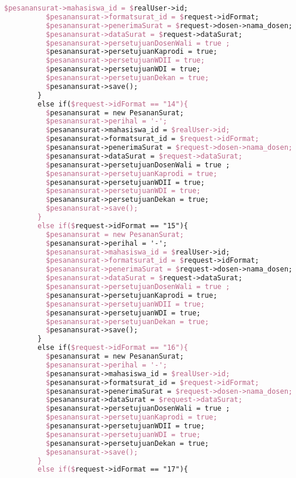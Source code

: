 \begin{lstlisting}[language=tex,basicstyle=\tiny,caption=PesanansuratController.php]
          $pesanansurat->mahasiswa_id = $realUser->id;
          $pesanansurat->formatsurat_id = $request->idFormat;
          $pesanansurat->penerimaSurat = $request->dosen->nama_dosen;
          $pesanansurat->dataSurat = $request->dataSurat;
          $pesanansurat->persetujuanDosenWali = true ;
          $pesanansurat->persetujuanKaprodi = true;
          $pesanansurat->persetujuanWDII = true;
          $pesanansurat->persetujuanWDI = true;
          $pesanansurat->persetujuanDekan = true;
          $pesanansurat->save();
        }
        else if($request->idFormat == "14"){
          $pesanansurat = new PesananSurat;
          $pesanansurat->perihal = '-';
          $pesanansurat->mahasiswa_id = $realUser->id;
          $pesanansurat->formatsurat_id = $request->idFormat;
          $pesanansurat->penerimaSurat = $request->dosen->nama_dosen;
          $pesanansurat->dataSurat = $request->dataSurat;
          $pesanansurat->persetujuanDosenWali = true ;
          $pesanansurat->persetujuanKaprodi = true;
          $pesanansurat->persetujuanWDII = true;
          $pesanansurat->persetujuanWDI = true;
          $pesanansurat->persetujuanDekan = true;
          $pesanansurat->save();
        }
        else if($request->idFormat == "15"){
          $pesanansurat = new PesananSurat;
          $pesanansurat->perihal = '-';
          $pesanansurat->mahasiswa_id = $realUser->id;
          $pesanansurat->formatsurat_id = $request->idFormat;
          $pesanansurat->penerimaSurat = $request->dosen->nama_dosen;
          $pesanansurat->dataSurat = $request->dataSurat;
          $pesanansurat->persetujuanDosenWali = true ;
          $pesanansurat->persetujuanKaprodi = true;
          $pesanansurat->persetujuanWDII = true;
          $pesanansurat->persetujuanWDI = true;
          $pesanansurat->persetujuanDekan = true;
          $pesanansurat->save();
        }
        else if($request->idFormat == "16"){
          $pesanansurat = new PesananSurat;
          $pesanansurat->perihal = '-';
          $pesanansurat->mahasiswa_id = $realUser->id;
          $pesanansurat->formatsurat_id = $request->idFormat;
          $pesanansurat->penerimaSurat = $request->dosen->nama_dosen;
          $pesanansurat->dataSurat = $request->dataSurat;
          $pesanansurat->persetujuanDosenWali = true ;
          $pesanansurat->persetujuanKaprodi = true;
          $pesanansurat->persetujuanWDII = true;
          $pesanansurat->persetujuanWDI = true;
          $pesanansurat->persetujuanDekan = true;
          $pesanansurat->save();
        }
        else if($request->idFormat == "17"){

\end{lstlisting}
